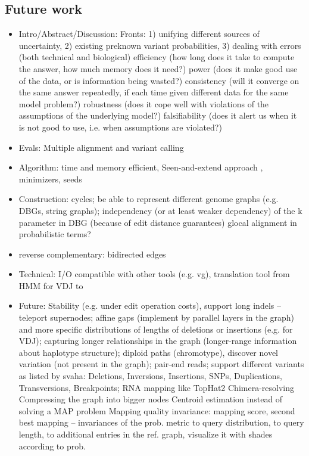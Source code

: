 \subsection{Future work}
\begin{itemize}
	\item Intro/Abstract/Discussion:
		Fronts: 1) unifying different sources of uncertainty, 2) existing preknown variant probabilities, 3) dealing with errors (both technical and biological)
		efficiency (how long does it take to compute the answer, how much memory does it need?)
  		power (does it make good use of the data, or is information being wasted?)
  		consistency (will it converge on the same answer repeatedly, if each time  given different data for the same model problem?)
  		robustness (does it cope well with violations of the assumptions of the underlying model?)
  		falsifiability (does it alert us when it is not good to use, i.e. when assumptions are violated?)
	\item Evals:
		Multiple alignment and variant calling
	\item Algorithm:
		time and memory efficient,
		Seen-and-extend approach \cite{liu2016debga}, minimizers, seeds 
	\item Construction:
		cycles; be able to represent different genome graphs (e.g. DBGs, string graphs); independency (or at least weaker dependency) of the k parameter in DBG (because of edit distance guarantees)
		glocal alignment in probabilistic terms?
	\item reverse complementary: bidirected edges
	\item Technical:
		I/O compatible with other tools (e.g. vg),
		translation tool from HMM for VDJ to \tool
	\item Future:
		Stability (e.g. under edit operation costs)\cite{gusfield1994parametric}, support long indels -- teleport supernodes;
		affine gaps (implement by parallel layers in the graph) and more specific distributions of lengths of deletions or insertions (e.g. for VDJ);
		capturing longer relationships in the graph (longer-range information about haplotype structure);
		diploid paths (chromotype), discover novel variation (not present in the graph);
		pair-end reads;
		support different variants as listed by svaha: Deletions, Inversions, Insertions, SNPs, Duplications, Transversions, Breakpoints; RNA mapping like TopHat2
		Chimera-resolving
		Compressing the graph into bigger nodes
		Centroid estimation instead of solving a MAP problem\cite{carvalho2008centroid,hamada2011probabilistic}	
		Mapping quality invariance: mapping score, second best mapping -- invariances of the prob. metric to query distribution, to query length, to additional entries in the ref. graph, visualize it with shades according to prob.
\end{itemize}
